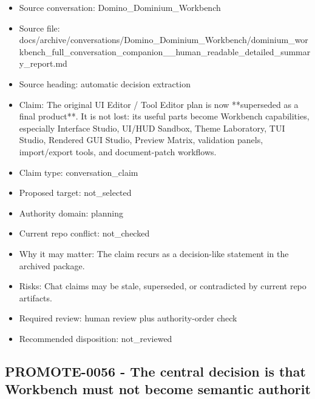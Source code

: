 \documentclass[11pt,a4paper]{report}
\begin{document}
\begin{itemize}
\item Source conversation: Domino\_Dominium\_Workbench
\item Source file: docs/archive/conversations/Domino\_Dominium\_Workbench/dominium\_workbench\_full\_conversation\_companion\_\_human\_readable\_detailed\_summary\_report.md
\item Source heading: automatic decision extraction
\item Claim: The original UI Editor / Tool Editor plan is now **superseded as a final product**. It is not lost: its useful parts become Workbench capabilities, especially Interface Studio, UI/HUD Sandbox, Theme Laboratory, TUI Studio, Rendered GUI Studio, Preview Matrix, validation panels, import/export tools, and document-patch workflows.
\item Claim type: conversation\_claim
\item Proposed target: not\_selected
\item Authority domain: planning
\item Current repo conflict: not\_checked
\item Why it may matter: The claim recurs as a decision-like statement in the archived package.
\item Risks: Chat claims may be stale, superseded, or contradicted by current repo artifacts.
\item Required review: human review plus authority-order check
\item Recommended disposition: not\_reviewed
\end{itemize}

\subsection{PROMOTE-0056 - The central decision is that Workbench must not become semantic authorit}
\end{document}
